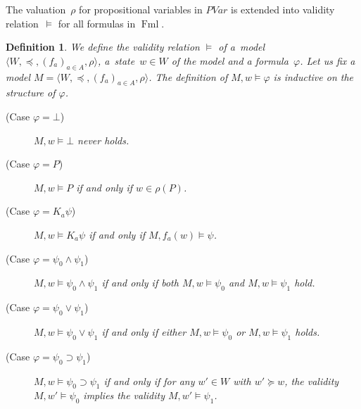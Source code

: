 \documentclass[doctor]{iscs-thesis}
\newcommand{\tuple}[1]{\langle{#1}\rangle}
\newcommand{\fml}{\operatorname{Fml}}
\newtheorem{definition}{Definition}
\begin{document}
The valuation~$\rho$ for propositional variables in $PVar$ is extended into validity
relation~$\models$ for all formulas in $\fml$.
\begin{definition}
 We define the \textit{validity relation} $\models$ of a~model
 $\tuple{W,\preceq,(f_a)_{a\in A},\rho}$, a~state~$w\in W$ of the model and a
 formula~$\varphi$.
 Let us fix a model $M=\tuple{W,\preceq,(f_a)_{a\in A},\rho}$.
\newcommand{\m}{M}
 The definition of $M,w\models\varphi$ is inductive on the structure of $\varphi$.
\begin{description}
 \item[(Case $\varphi=\bot$)] $\m, w\models \bot$ never holds.
\item[(Case $\varphi= P$)] $\m, w\models P$ if and only if 
$w \in
 \rho(P)$.
 \item[(Case $\varphi = K_a \psi$)] 
	    $\m, w\models K_a \psi$ if and only if
	    $\m, f_a(w)\models \psi$.
\item[(Case $\varphi = \psi_0\wedge\psi_1$)]
 $\m, w\models \psi_0\wedge\psi_1$ if and only if both
 $\m, w\models \psi_0$ and $\m,w\models \psi_1$ hold.
\item[(Case $\varphi = \psi_0\vee\psi_1$)]
 $\m, w\models \psi_0\vee\psi_1$ if and only if either
 $\m, w\models \psi_0$ or $\m,w\models \psi_1$ holds.
\item[(Case $\varphi = \psi_0\supset \psi_1$)]
	   $\m, w\models \psi_0\supset\psi_1$ if and only if 
	   for any $w'\in W$ with $w'\succeq w$, the validity $M,w'\models \psi_0$ implies
	   the validity $M, w'\models
	   \psi_1$.
\end{description}
\end{definition}
\end{document}
